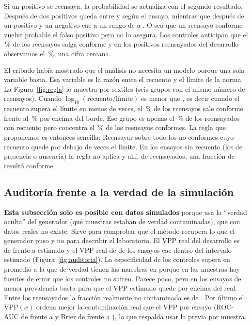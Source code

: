 Si un positivo se reensaya, la probabilidad se actualiza con el segundo
resultado. Después de dos positivos queda entre \ClfPosteriorMasMasMin{} y
\ClfPosteriorMasMasMax{} según el ensayo, mientras que después de un positivo
y un negativo cae a un rango de \ClfPosteriorMasMenosMin{} a
\ClfPosteriorMasMenosMax{}. O sea que un reensayo conforme vuelve probable el
falso positivo pero no lo asegura. Los controles anticipan que el
\ClfReensayoConformeEsperadoPct{}\,\% de los reensayos salga conforme y en los
\ClfReensayados{} positivos reensayados del desarrollo observamos el
\ClfReensayoConformeObservadoPct{}\,\%, una cifra cercana.

El cribado había mostrado que el análisis
 no necesita un modelo porque una sola
variable basta. Esa variable es la razón entre el recuento y el límite de
la norma. La Figura~\ref{fig:regla} lo muestra por sextiles (seis grupos con
el mismo número de reensayos). Cuando $\log_{10}(\text{recuento}/\text{límite})$
es menor que \ClfReglaBorde{}, es decir cuando el recuento supera el límite en
menos de \ClfReglaVecesLimite{} veces, el \ClfReglaTasaBajoPct{}\,\% de los
reensayos sale conforme frente al \ClfReglaTasaAltoPct{}\,\% por encima del
borde. Ese grupo es apenas el \ClfReglaGrupoPct{}\,\% de los reensayados con
recuento pero concentra el \ClfReglaCapturaPct{}\,\% de los reensayos
conformes. La regla que proponemos es entonces sencilla: Reensayar sobre todo
los no conformes cuyo recuento quede por debajo de \ClfReglaVecesLimite{}
veces el límite. En los ensayos sin recuento (los de presencia o ausencia) la
regla no aplica y allí, de \ClfSinRazonReensayados{} reensayados, una fracción
de \ClfSinRazonConformes{} resultó conforme.

\subsection{Auditoría frente a la verdad de la simulación}
\label{sec:auditoria-bayes}

\textbf{Esta subsección solo es posible con datos simulados} porque usa la
``verdad oculta'' del generador (qué muestras estaban de verdad
contaminadas), que con datos reales no existe. Sirve para comprobar que el
método recupera lo que el generador puso y no para describir el laboratorio.
El VPP real del desarrollo es de \ClfAudVPPReal{} frente a \ClfVPPGlobal{}
estimado y el VPP real de \ClfAudEnsayosDentroIC{} de los \ClfEnsayos{}
ensayos cae dentro del intervalo estimado (Figura~\ref{fig:auditoria}). La
especificidad de los controles supera en promedio a la que de verdad tienen
las muestras en \ClfAudSesgoEspec{} porque en las muestras hay fuentes de
error que los controles no sufren. Parece poco, pero en los ensayos de menor
prevalencia basta para que el VPP estimado quede por encima del real. Entre
los reensayados la fracción realmente no contaminada es de
\ClfAudFalsoRealReensayados{}. Por último el VPP$(x)$ ordena mejor la
contaminación real que el VPP por ensayo (ROC-AUC de \ClfAudAUCVPPx{} frente
a \ClfAudAUCVPPEnsayo{} y Brier de \ClfAudBrierVPPx{} frente a
\ClfAudBrierVPPEnsayo{}), lo que respalda usar la previa por muestra.

